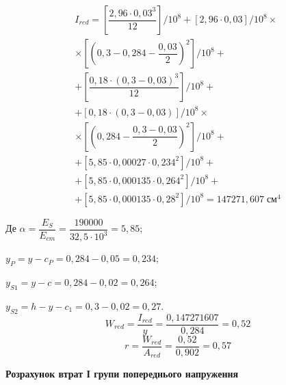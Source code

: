 \documentclass[a4paper,14pt]{article}
\begin{document}
\begin{multline*}
    I_{red} = \left[\dfrac{2,96 \cdot 0,03^3}{12}\right]/ 10^8 + \left[2,96 \cdot 0,03 \right] / 10^8 \times \\ \times \left[ \left(0,3 - 0,284 - \dfrac{0,03}{2}\right)^2\right] / 10^8 + \\ + \left[\dfrac{0,18 \cdot (0,3 - 0,03)^3}{12}\right]/ 10^8 + \\ + \left[0,18 \cdot (0,3 - 0,03)\right]/10^8 \times \\ \times \left[\left(0,284 - \dfrac{0,3 - 0,03}{2}\right)^2 \right] /10^8 + \\ + \left[5,85 \cdot 0,00027 \cdot 0,234^2\right]/10^8 +\\+ \left[5,85 \cdot 0,000135 \cdot 0,264^2\right] / 10^8 +\\+ \left[5,85 \cdot 0,000135 \cdot 0,28^2\right] / 10^8  = 147271,607\;\textit{см}^4
\end{multline*}

Де $\alpha = \dfrac{E_S}{E_{cm}} = \dfrac{190000}{32,5 \cdot 10^3} = 5,85$;

$y_P = y - c_P = 0,284 - 0,05 = 0,234$;

$y_{S1} = y - c = 0,284 - 0,02 = 0,264$;

$y_{S2} = h - y - c_1 = 0,3 - 0,02 = 0,27$.
\begin{equation}
    W_{red} = \dfrac{I_{red}}{y} = \dfrac{0,147271607}{0,284} = 0,52
\end{equation}
\begin{equation}
    r = \dfrac{W_{red}}{A_{red}} = \dfrac{0,52}{0,902} = 0,57
\end{equation}

\textbf{Розрахунок втрат І групи попереднього напруження}
\end{document}
